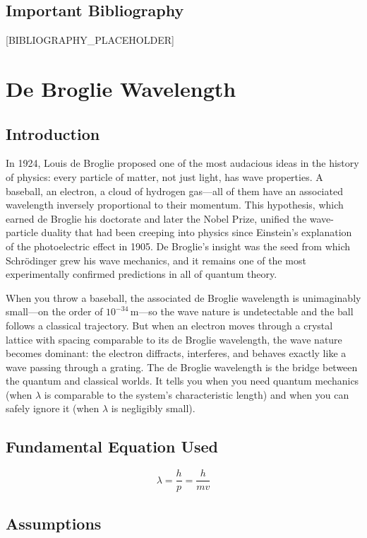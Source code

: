 \documentclass[11pt,openright]{book}
\begin{document}
\section*{Important Bibliography}

[BIBLIOGRAPHY_PLACEHOLDER]


\chapter{De Broglie Wavelength}

\section*{Introduction}

In 1924, Louis de Broglie proposed one of the most audacious ideas in the history of physics: every particle of matter, not just light, has wave properties. A baseball, an electron, a cloud of hydrogen gas---all of them have an associated wavelength inversely proportional to their momentum. This hypothesis, which earned de Broglie his doctorate and later the Nobel Prize, unified the wave-particle duality that had been creeping into physics since Einstein's explanation of the photoelectric effect in 1905. De Broglie's insight was the seed from which Schrödinger grew his wave mechanics, and it remains one of the most experimentally confirmed predictions in all of quantum theory.

When you throw a baseball, the associated de Broglie wavelength is unimaginably small---on the order of $10^{-34}\,\text{m}$---so the wave nature is undetectable and the ball follows a classical trajectory. But when an electron moves through a crystal lattice with spacing comparable to its de Broglie wavelength, the wave nature becomes dominant: the electron diffracts, interferes, and behaves exactly like a wave passing through a grating. The de Broglie wavelength is the bridge between the quantum and classical worlds. It tells you when you need quantum mechanics (when $\lambda$ is comparable to the system's characteristic length) and when you can safely ignore it (when $\lambda$ is negligibly small).
\section*{Fundamental Equation Used}

\begin{equation}
\lambda = \frac{h}{p} = \frac{h}{mv}
\end{equation}
\section*{Assumptions}
\end{document}
